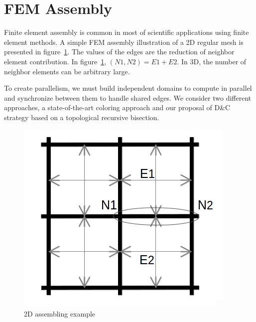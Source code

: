 \documentclass{IOS-Book-Article}
\begin{document}
\section{FEM Assembly}

Finite element assembly is common in most of scientific applications using finite element methods.
A simple FEM assembly illustration of a 2D regular mesh is presented in figure~\ref{fig:2Dasm}.
The values of the edges are the reduction of neighbor element contribution. In figure~\ref{fig:2Dasm}, $(N1,N2) = E1 + E2$.
In 3D, the number of neighbor elements can be arbitrary large.

To create parallelism, we must build independent domains to compute in parallel and synchronize between them to handle shared edges.
We consider two different approaches, a state-of-the-art coloring approach and our proposal of D\&C strategy based on a topological recursive bisection.
\begin{figure}[htp]
 \centering
 \includegraphics[scale=0.2]{2D_asm.png}
 \caption{2D assembling example}
 \label{fig:2Dasm}
\end{figure}
\end{document}
